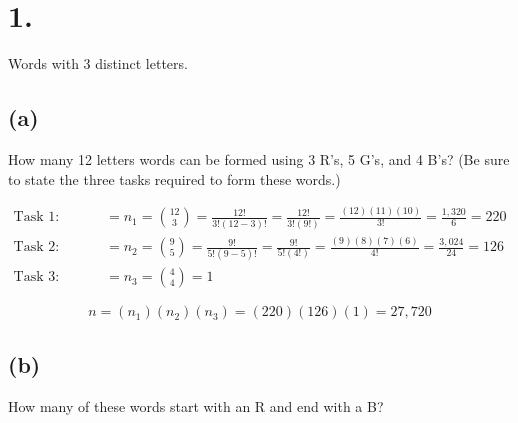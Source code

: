 

\renewcommand\assignment{Worksheet 6, due Wednesday 1 February, 4:15pm}


    \section*{1.}
    Words with 3 distinct letters.

    \subsection*{(a)}
    How many 12 letters words can be formed using 3 R's, 5 G's, and 4 B's? (Be sure to state the three tasks required to form these words.)

    \begin{mdframed}
        \begin{align*}
            \text{Task 1: Assign the 3 R's} & = n_1 = {12 \choose 3} = \frac{12!}{3!(12-3)!} = \frac{12!}{3!(9!)} = \frac{(12)(11)(10)}{3!} = \frac{1,320}{6} = 220 \\
            \text{Task 2: Assign the 5 G's} & = n_2 = {9 \choose 5} = \frac{9!}{5!(9-5)!} = \frac{9!}{5!(4!)} = \frac{(9)(8)(7)(6)}{4!} = \frac{3,024}{24} = 126 \\
            \text{Task 3: Assign the 4 B's} & = n_3 = {4 \choose 4} = 1 
    \end{align*}

    \begin{equation*}
        n = (n_1)(n_2)(n_3) = (220)(126)(1) = \boxed{27,720}
    \end{equation*}

    \end{mdframed}

    \subsection*{(b)}
    How many of these words start with an R and end with a B?

